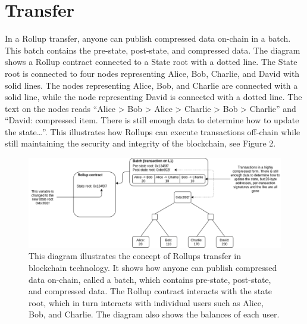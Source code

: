 \documentclass{report}
\begin{document}
\section{Transfer}
In a Rollup transfer, anyone can publish compressed data on-chain in a batch. This batch contains the pre-state, post-state, and compressed data. The diagram shows a Rollup contract connected to a State root with a dotted line. The State root is connected to four nodes representing Alice, Bob, Charlie, and David with solid lines. The nodes representing Alice, Bob, and Charlie are connected with a solid line, while the node representing David is connected with a dotted line. The text on the nodes reads “Alice > Bob > Alice > Charlie > Bob > Charlie” and “David: compressed item. There is still enough data to determine how to update the state…”. This illustrates how Rollups can execute transactions off-chain while still maintaining the security and integrity of the blockchain, see Figure 2.
\begin{center}
	\begin{figure}
		\centering
		\includegraphics[width=0.8\linewidth]{Fig/F2}
		\caption{This diagram illustrates the concept of Rollups transfer in blockchain technology. It shows how anyone can publish compressed data on-chain, called a batch, which contains pre-state, post-state, and compressed data. The Rollup contract interacts with the state root, which in turn interacts with individual users such as Alice, Bob, and Charlie. The diagram also shows the balances of each user.
		}
		\label{fig:f1}
	\end{figure}
\end{center}
\end{document}
